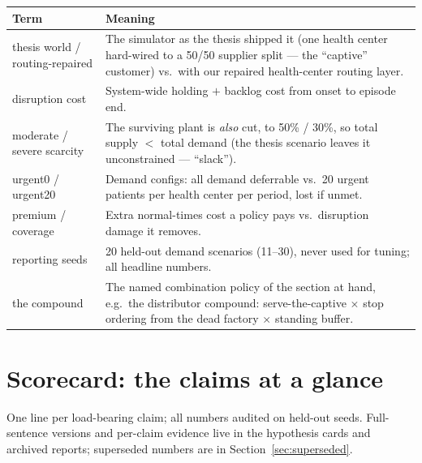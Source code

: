 \documentclass[11pt]{article}
\begin{document}
{\footnotesize
\begin{xltabular}{\textwidth}{@{}>{\raggedright\arraybackslash}p{3.2cm}X@{}}
\toprule
\textbf{Term} & \textbf{Meaning} \\
\midrule
\endhead
\bottomrule
\endlastfoot
thesis world / routing-repaired & The simulator as the thesis shipped it (one health
center hard-wired to a 50/50 supplier split --- the ``captive'' customer) vs.\ with our
repaired health-center routing layer. \\
disruption cost & System-wide holding $+$ backlog cost from onset to episode end. \\
moderate / severe scarcity & The surviving plant is \emph{also} cut, to 50\% / 30\%, so
total supply $<$ total demand (the thesis scenario leaves it unconstrained --- ``slack''). \\
urgent0 / urgent20 & Demand configs: all demand deferrable vs.\ 20 urgent patients per
health center per period, lost if unmet. \\
premium / coverage & Extra normal-times cost a policy pays vs.\ disruption damage it
removes. \\
reporting seeds & 20 held-out demand scenarios (11--30), never used for tuning; all
headline numbers. \\
the compound & The named combination policy of the section at hand, e.g.\ the
distributor compound: serve-the-captive $\times$ stop ordering from the dead factory
$\times$ standing buffer. \\
\end{xltabular}%
}

\section{Scorecard: the claims at a glance}\label{sec:claims}

One line per load-bearing claim; all numbers audited on held-out seeds. Full-sentence
versions and per-claim evidence live in the hypothesis cards and archived reports;
superseded numbers are in Section~\ref{sec:superseded}.
\end{document}

